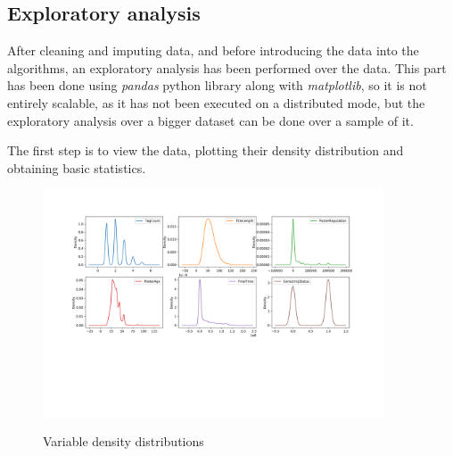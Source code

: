 \documentclass[11pt]{book} %
\begin{document}
    \subsection{Exploratory analysis}

      After cleaning and imputing data, and before introducing the data into the algorithms, an exploratory analysis has been performed over the data. This part has been done using \emph{pandas} python library along with \emph{matplotlib}, so it is not entirely scalable, as it has not been executed on a distributed mode, but the exploratory analysis over a bigger dataset can be done over a sample of it.

      The first step is to view the data, plotting their density distribution and obtaining basic statistics.

      \begin{figure}[!ht]
        \includegraphics[width=0.9\textwidth]{variables_density_distribution.png}
        \label{img:density}
        \caption{Variable density distributions}
      \end{figure}
\end{document}
